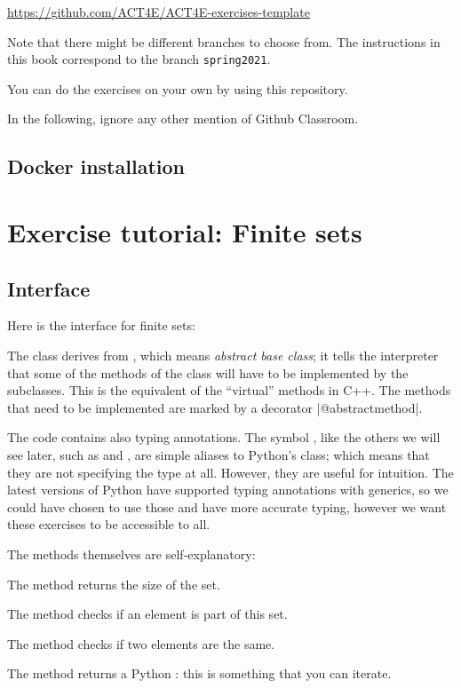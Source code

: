 \url{https://github.com/ACT4E/ACT4E-exercises-template}

Note that there might be different branches to choose from. The instructions in this book correspond to
the branch \texttt{spring2021}.

You can do the exercises on your own by using this repository.

In the following, ignore any other mention of Github Classroom.

\subsection{Docker installation}



\section{Exercise tutorial: Finite sets}\label{sec:exercise-tutorial}

\subsection*{Interface}
Here is the interface for finite sets:
%

The class derives from , which means \emph{abstract base class}; it tells the interpreter
that some of the methods of the class will have to be implemented by the subclasses. This is the equivalent
of the ``virtual'' methods in C++.
The methods that need to be implemented are marked by a decorator \pystr|@abstractmethod|.


The code contains also typing annotations.
The symbol , like the others we will see later, such as  and , are simple aliases to Python's  class; which means that they are not specifying the type at all.
However, they are useful for intuition.
The latest versions of Python have supported typing annotations with generics, so we could have chosen to use those and have more accurate typing, however we want these exercises to be accessible to all.

The methods themselves are self-explanatory:

\begin{compactitem}
  \item The method  returns the size of the set.
  \item The method  checks if an element is part of this set.
  \item The method  checks if two elements are the same.
  \item The method  returns a Python : this is something that you can iterate.
\end{compactitem}

